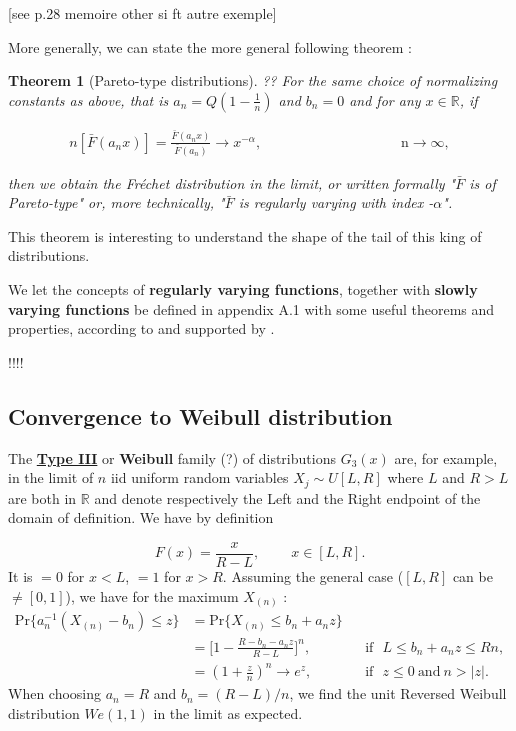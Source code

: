 \documentclass[11pt,a4paper,openany ]{book}
\newtheorem{theorem}{Theorem}[chapter]
\begin{document}
[see p.28 memoire other si ft autre exemple]


More generally, we can state the more general following theorem :
\begin{theorem}[Pareto-type distributions] ?? For the same choice of normalizing constants as above, that is $a_n=Q(1-\frac{1}{n})$ and $b_n=0$ and for any $x\in\mathbb{R}$, if
	
	\begin{equation}
	\begin{aligned}
	n[\bar{F}(a_nx)]= \frac{\bar{F}(a_nx)}{\bar{F}(a_n)}\rightarrow x^{-\alpha} ,&&&&&&&&&&&& \text{ n}\to\infty,
	\end{aligned}
	\end{equation}
	
	then we obtain the Fréchet distribution in the limit, or written formally "\emph{$\bar{F}$ is of Pareto-type}" or, more technically, "\emph{$\bar{F}$ is regularly varying with index -$\alpha$}".
\end{theorem}

This theorem is interesting to understand the shape of the tail of this king of distributions. 

We let the concepts of \textbf{regularly varying functions}, together with \textbf{slowly varying functions} be defined in appendix A.1 with some useful theorems and properties, according to \citet[pp.51-54]{beirlant_practical_1996} and supported by \citet[pp.49, 77-82]{beirlant_statistics_2006}.

\citet[pp.75]{beirlant_statistics_2006} !!!!

\subsection*{Convergence to Weibull distribution}

The \textbf{\underline{Type III}} or \textbf{Weibull} family (?) of distributions $G_3(x)$ are, for example, in the limit of $n$ iid uniform random variables $X_j\sim U[L,R]$ where $L$ and $R>L$ are both in $\mathbb{R}$  and denote respectively the Left and the Right endpoint of the domain of definition. We have by definition

\begin{equation*}
F(x)=\frac{x}{R-L}, \ \ \ \ \ \ \ \  \ \ x\in [L,R].
\end{equation*}
It is $=0$ for $x<L$,  $=1$ for $x>R$.
Assuming the general case ($[L,R]$ can be $\neq [0,1]$), we have for the maximum $X_{(n)}$
:
\begin{equation*}
\begin{aligned}
\text{Pr}\{a_n^{-1}(X_{(n)}-b_n)\leq z\}
&=\text{Pr}\{X_{(n)}\leq b_n+a_nz\} \\
& = \Big[1-\frac{R-b_n-a_nz}{R-L}\Big]^n, & & \text{if}\ \ \ L\leq b_n+a_nz\leq Rn, \\ 
& = (1+\frac{z}{n})^n\to e^z, & & \text{if} \ \ \  z\leq 0 \ \text{and} \ n>|z|.
\end{aligned}
\end{equation*}
When choosing $a_n=R$ and $b_n=(R-L)/n$, we find the unit Reversed Weibull distribution $We(1,1)$ in the limit as expected.
\newline
\end{document}
